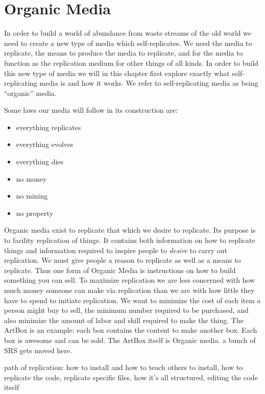 

\section{Organic Media}\label{organic-media}

In order to build a world of abundance from waste streams of the old world we need to create a new type of media which self-replicates.  We need the media to replicate, the means to produce the media to replicate, and for the media to function as the replication medium for other things of all kinds.  In order to build this new type of media we will in this chapter first explore exactly what self-replicating media is and how it works.  We refer to self-replicating media as  being ``organic'' media.


Some laws our media will follow in its construction are:

\begin{itemize}
\item
  everything replicates
\item
  everything evolves
\item
  everything dies
\item
  no money
\item
  no mining
\item
  no property
\end{itemize}

Organic media exist to replicate that which we desire to replicate.  Its purpose is to facility replication of things.  It contains both information on how to replicate things and information required to inspire people to \emph{desire} to carry out replication.  We must give people a reason to replicate as well as a means to replicate.  Thus one form of Organic Media is instructions on how to build something you can sell.  To maximize replication we are less concerned with how much money someone can make via replication than we are with how little they have to spend to initiate replication.  We want to minimize the cost of each item a person might buy to sell, the minimum number required to be purchased, and also minimize the amount of labor and skill required to make the thing.  The ArtBox is an example: each box contains the content to make another box.  Each box is awesome and can be sold.  The ArtBox itself is Organic media.  a bunch of SRS gets moved here.


path of replication: how to install and how to teach others to install,
how to replicate the code, replicate specific files, how it's all
structured, editing the code itself

